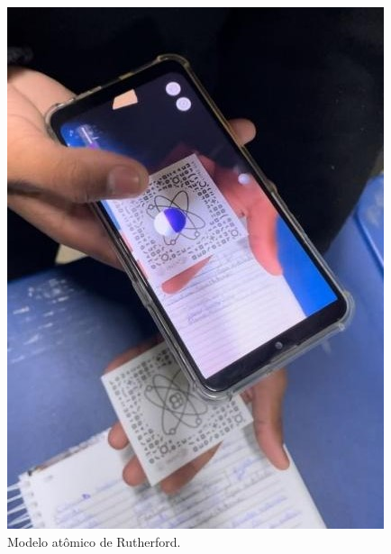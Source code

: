 \documentclass[portuguese]{textolivre}
\begin{document}
\begin{figure}[htbp]
\centering
\begin{minipage}{0.55\textwidth}
\includegraphics[angle=90,width =\textwidth]{Imagens/Fig3.jpg}
\caption{Modelo atômico de Rutherford.}
\label{fig-3}
\end{minipage}
\end{figure}
\end{document}
